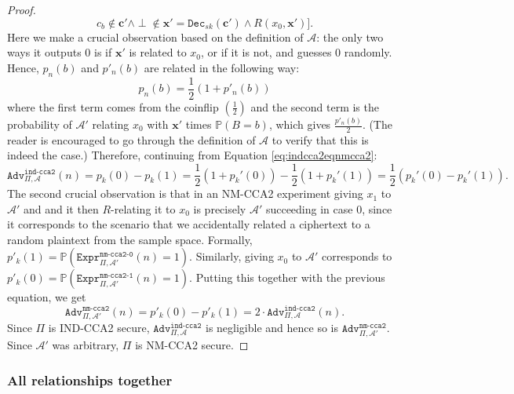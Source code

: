 \documentclass{article}
\theoremstyle{definition}
\theoremstyle{example}
\newcommand{\Dec}{\texttt{Dec}}
\newcommand{\A}{\mathcal{A}}
\newcommand{\Prob}{\mathbb{P}}
\newcommand{\Expr}[2]{\texttt{Expr}^{\texttt{#1}}_{#2}}
\newcommand{\Adv}[2]{\texttt{Adv}^{\texttt{#1}}_{#2}}
\renewcommand{\vec}[1]{\mathbf{#1}}
\begin{document}
\begin{proof}
\[    c_b \not\in \vec{c}' \land \perp \not\in \vec{x}' = \Dec_{sk}(\vec{c}') \land R(x_0, \vec{x}')].
  \]
  Here we make a crucial observation based on the definition of $\A$: the only
  two ways it outputs $0$ is if $\vec{x}'$ is related to $x_0$, or if it is not,
  and guesses $0$ randomly. Hence, $p_n(b)$ and $p'_n(b)$ are related in the
  following way:
  \[
    p_n(b) = \frac12 (1 + p'_n(b))
  \]
  where the first term comes from the coinflip $(\frac12)$ and the second term
  is the probability of $\A'$ relating $x_0$ with $\vec{x}'$ times $\Prob(B =
  b)$, which gives $\frac{p'_n(b)}{2}$. (The reader is encouraged to go through
  the definition of $\A$ to verify that this is indeed the case.)
  Therefore, continuing from Equation \ref{eq:indcca2eqnmcca2}:
  \[
    \Adv{ind-cca2}{\Pi, \A}(n) = p_k(0) - p_k(1) = \frac12 (1 + p_k'(0)) -
    \frac12 (1 + p_k'(1)) = \frac12 (p_k'(0) - p_k'(1)).
  \]
  The second crucial observation is that in an NM-CCA2 experiment giving $x_1$
  to $\A'$ and and it then $R$-relating it to $x_0$ is precisely $\A'$
  succeeding in case 0, since it corresponds to the scenario that we
  accidentally related a ciphertext to a random plaintext from the sample space.
  Formally, $p'_k(1) = \Prob(\Expr{nm-cca2-0}{\Pi, \A'}(n) = 1)$. Similarly,
  giving $x_0$ to $\A'$ corresponds to $p'_k(0) = \Prob(\Expr{nm-cca2-1}{\Pi, \A'}(n) =
  1)$. Putting this together with the previous equation, we get
  \[
    \Adv{nm-cca2}{\Pi, \A'}(n) = p'_k(0) - p'_k(1) = 2\cdot\Adv{ind-cca2}{\Pi, \A}(n).
  \]
  Since $\Pi$ is IND-CCA2 secure, $\Adv{ind-cca2}{\Pi, \A}$ is negligible and
  hence so is $\Adv{nm-cca2}{\Pi, \A'}$. Since $\A'$ was arbitrary, $\Pi$ is
  NM-CCA2 secure.
\end{proof}
\subsubsection{All relationships together}
\label{sec:allrelations}
\end{document}
